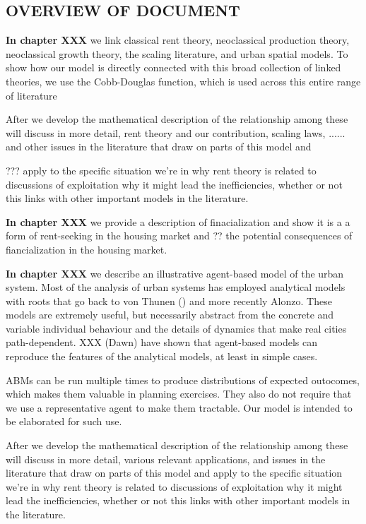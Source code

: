 \subsection{OVERVIEW OF DOCUMENT}
\color{blue}

\textbf{In chapter XXX}  we link classical rent theory, neoclassical production theory, neoclassical growth theory, the scaling literature, and urban spatial models.
To show how our model is directly connected with this broad collection of linked theories, we use the Cobb-Douglas function, which is used across this entire range of literature 

After we develop the mathematical description of the relationship among these will discuss  in more detail, rent theory and our contribution, scaling laws, ......  and other issues in the literature that draw on parts of this model and 

???  apply to the specific situation we're in why rent theory is related to discussions of exploitation why it might lead the inefficiencies, whether or not this links with other important models in the literature.

\textbf{In chapter XXX} we  provide a description of finacialization and show it is a a form of rent-seeking in the housing market and ?? the potential consequences of fiancialization in the housing market. 



\textbf{In chapter XXX} we  describe an illustrative agent-based model of the urban system. Most of the analysis of urban systems has employed analytical models with roots that go back to von Thunen () and more recently Alonzo. These models are extremely useful, but necessarily abstract from the concrete  and variable individual behaviour and  the details  of dynamics that make real cities path-dependent. XXX (Dawn) have shown that agent-based models can reproduce the features of the analytical models, at least in simple cases. 

ABMs can be run multiple times to produce distributions of expected outocomes, which makes them valuable in planning exercises. They also do not require  that we use a representative agent to make them tractable. Our model is intended to be elaborated  for such use. 

After we develop the mathematical description of the relationship among these will discuss in more detail, various relevant applications, and issues in the literature that draw on parts of this model and apply to the specific situation we're in why rent theory is related to discussions of exploitation why it might lead the inefficiencies, whether or not this links with other important models in the literature.


